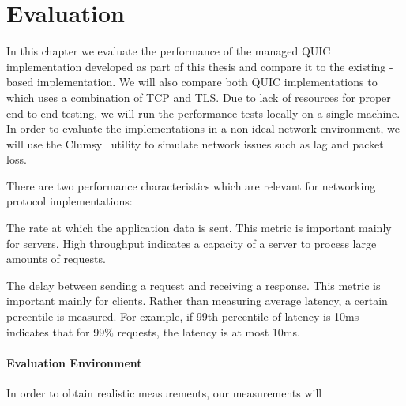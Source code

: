 \chapter{Evaluation}

In this chapter we evaluate the performance of the managed QUIC implementation developed as part of
this thesis and compare it to the existing \libmsquic{}-based implementation. We will also compare
both QUIC implementations to  which uses a combination of TCP and TLS. Due to lack
of resources for proper end-to-end testing, we will run the performance tests locally on a single
machine. In order to evaluate the implementations in a non-ideal network environment, we will use
the Clumsy~\cite{clumsy} utility to simulate network issues such as lag and packet loss.

There are two performance characteristics which are relevant for networking protocol implementations:

\begin{itemize}

   The rate at which the application data is sent. This metric is important mainly
for servers. High throughput indicates a capacity of a server to process large amounts of requests.

   The delay between sending a request and receiving a response. This
metric is important mainly for clients. Rather than measuring average latency, a certain percentile
is measured. For example, if 99th percentile of latency is 10ms indicates that for 99\% requests,
the latency is at most 10ms.

\end{itemize}

\subsubsection{Evaluation Environment}

In order to obtain realistic measurements, our measurements will


\subsection{}





